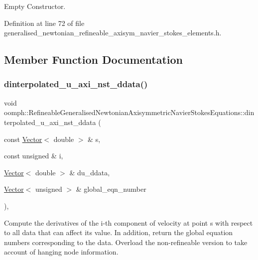 Empty Constructor. 



Definition at line 72 of file generalised\+\_\+newtonian\+\_\+refineable\+\_\+axisym\+\_\+navier\+\_\+stokes\+\_\+elements.\+h.



\subsection{Member Function Documentation}
\mbox{\label{classoomph_1_1RefineableGeneralisedNewtonianAxisymmetricNavierStokesEquations_a36b7f19e66187a7b0fef8e0134e716f4}} 
\subsubsection{\texorpdfstring{dinterpolated\+\_\+u\+\_\+axi\+\_\+nst\+\_\+ddata()}{dinterpolated\_u\_axi\_nst\_ddata()}}
{\footnotesize\ttfamily void oomph\+::\+Refineable\+Generalised\+Newtonian\+Axisymmetric\+Navier\+Stokes\+Equations\+::dinterpolated\+\_\+u\+\_\+axi\+\_\+nst\+\_\+ddata (\begin{DoxyParamCaption}\item[{const \hyperlink{classoomph_1_1Vector}{Vector}$<$ double $>$ \&}]{s,  }\item[{const unsigned \&}]{i,  }\item[{\hyperlink{classoomph_1_1Vector}{Vector}$<$ double $>$ \&}]{du\+\_\+ddata,  }\item[{\hyperlink{classoomph_1_1Vector}{Vector}$<$ unsigned $>$ \&}]{global\+\_\+eqn\+\_\+number }\end{DoxyParamCaption})\hspace{0.3cm}{\ttfamily [inline]}, {\ttfamily [virtual]}}



Compute the derivatives of the i-\/th component of velocity at point s with respect to all data that can affect its value. In addition, return the global equation numbers corresponding to the data. Overload the non-\/refineable version to take account of hanging node information. 



